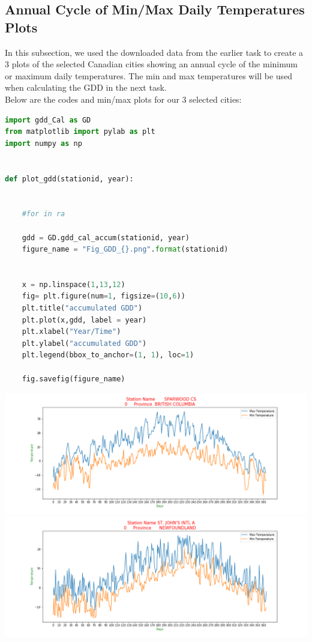 \subsection{Annual Cycle of Min/Max Daily Temperatures Plots }
In this subsection, we used the downloaded data from the earlier task to create a 3 plots of the selected Canadian cities showing an annual cycle of the minimum or maximum daily temperatures. The min and max temperatures will be used when calculating the GDD in the next task. \\
Below are the codes and min/max plots for our 3 selected cities:\\

\begin{lstlisting}[language=Python]
import gdd_Cal as GD
from matplotlib import pylab as plt
import numpy as np


def plot_gdd(stationid, year):
    
   
    #for in ra
    
    gdd = GD.gdd_cal_accum(stationid, year)
    figure_name = "Fig_GDD_{}.png".format(stationid)
    
    
    x = np.linspace(1,13,12)
    fig= plt.figure(num=1, figsize=(10,6))
    plt.title("accumulated GDD")
    plt.plot(x,gdd, label = year)
    plt.xlabel("Year/Time")
    plt.ylabel("accumulated GDD")
    plt.legend(bbox_to_anchor=(1, 1), loc=1)
    
    fig.savefig(figure_name)
\end{lstlisting}

\includegraphics[scale=0.35]{Fig_6842_2015.png}\\

\includegraphics[scale=0.35]{Fig_50089_2015.png}\\

